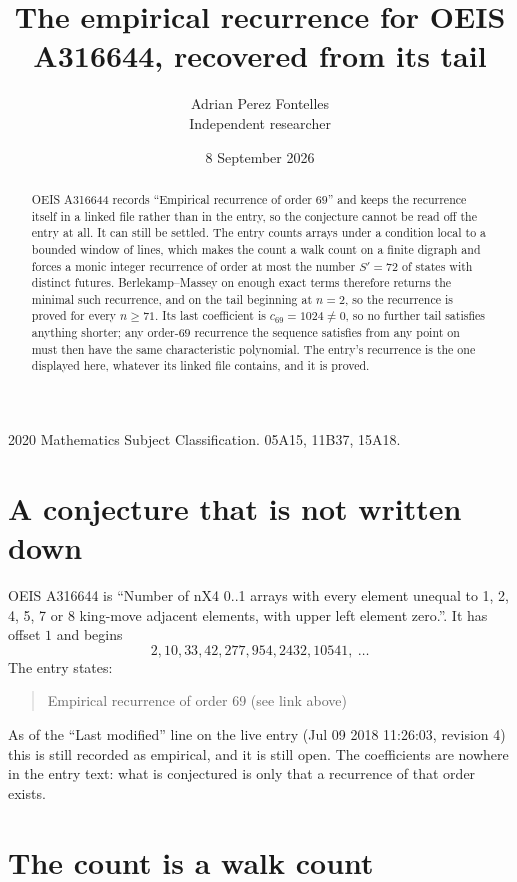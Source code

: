 \documentclass[11pt,a4paper]{article}
\title{The empirical recurrence for OEIS A316644, recovered from its tail}
\author{Adrian Perez Fontelles\\ \small Independent researcher}
\date{8 September 2026}
\theoremstyle{plain}
\theoremstyle{definition}
\begin{document}
\maketitle

\begin{abstract}
OEIS A316644 records ``Empirical recurrence of order $69$'' and keeps the recurrence itself in
a linked file rather than in the entry, so the conjecture cannot be read off the entry at all.
It can still be settled. The entry counts arrays under a condition local to a bounded window of
lines, which makes the count a walk count on a finite digraph and forces a monic integer
recurrence of order at most the number $S'=72$ of states with distinct futures. Berlekamp--Massey on
enough exact terms therefore returns the minimal such recurrence, and on the tail beginning at $n=2$, so the recurrence is proved for every $n\ge71$.
Its last coefficient is $c_{69}=1024\neq0$, so no further tail satisfies anything
shorter; any order-$69$ recurrence the sequence satisfies from any point on must then have
the same characteristic polynomial. The entry's recurrence is the one displayed here, whatever
its linked file contains, and it is proved.
\end{abstract}

\noindent\small 2020 Mathematics Subject Classification. 05A15, 11B37, 15A18.\normalsize

\section{A conjecture that is not written down}

OEIS A316644 is ``Number of nX4 0..1 arrays with every element unequal to 1, 2, 4, 5, 7 or 8 king-move adjacent elements, with upper left element zero.''. It has offset $1$ and begins
\[
2, 10, 33, 42, 277, 954, 2432, 10541,\ \dots
\]
The entry states:
\begin{quote}
Empirical recurrence of order 69 (see link above)
\end{quote}
As of the ``Last modified'' line on the live entry (Jul 09 2018 11:26:03, revision 4)
this is still recorded as empirical, and it is still open. The coefficients are nowhere in the
entry text: what is conjectured is only that a recurrence of that order exists.

\section{The count is a walk count}
\end{document}
